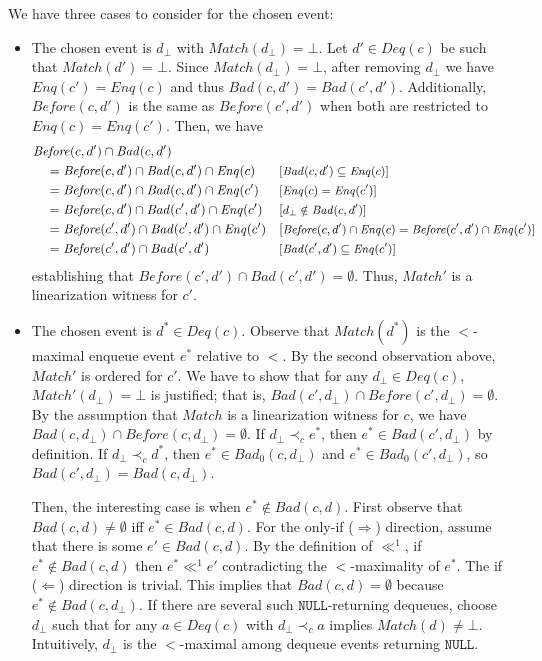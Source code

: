 \documentclass{LMCS}
\newcommand{\NULL}{\ensuremath{\mathtt{NULL}}}
\newcommand{\Match}{\ensuremath{\mathit{Match}}}
\newcommand{\Deq}[1]{\ensuremath{\mathit{Deq}({#1})}}
\newcommand{\Enq}[1]{\ensuremath{\mathit{Enq}({#1})}}
\newcommand{\Before}[2]{\ensuremath{\mathit{Before}({#1},{#2})}}
\newcommand{\Bad}[2]{\ensuremath{\mathit{Bad}(#1,#2)}}
\newcommand{\Badx}[3]{\ensuremath{\mathit{Bad}_{#3}(#1,#2)}}
\newcommand{\dhat}{\ensuremath{d_{\bot}}}
\begin{document}
We have three cases to consider for the chosen event:
\begin{itemize} 
\item The chosen event is $\dhat$ with $\Match(\dhat)=\bot$.
Let $d'\in \Deq c$ be such that $\Match(d')=\bot$.
Since $\Match(\dhat)=\bot$, after removing $\dhat$ we have $\Enq {c'}=\Enq c$ and thus $\Bad c {d'}=\Bad {c'} {d'}$.
Additionally, $\Before c {d'}$ is the same as $\Before {c'} {d'}$ when both are restricted to $\Enq c=\Enq {c'}$.
Then, we have
\begin{align*}
&\Before c {d'} \cap \Bad c {d'} &&\\
&\quad=\Before c {d'} \cap \Bad c {d'} \cap \Enq c &&\textnormal{\small [$\Bad c {d'}\subseteq \Enq c$]}\\
&\quad= \Before c {d'} \cap \Bad c {d'} \cap \Enq {c'} &&\textnormal{\small[$\Enq c=\Enq {c'}$]}\\
&\quad= \Before c {d'} \cap \Bad {c'} {d'} \cap \Enq {c'} &&\textnormal{[\small$\dhat\notin \Bad c {d'}$]}\\
&\quad= \Before {c'} {d'} \cap \Bad {c'} {d'} \cap \Enq {c'} &&\textnormal{[\small$\Before c {d'}\cap \Enq c=\Before {c'} {d'}\cap \Enq {c'}$]}\\
&\quad= \Before {c'} {d'} \cap \Bad {c'} {d'} &&\textnormal{\small[$\Bad {c'} {d'}\subseteq \Enq {c'}$]}
\end{align*}
establishing that $\Before {c'} {d'}\cap \Bad {c'} {d'}=\emptyset$.
Thus, $\Match'$ is a linearization witness for $c'$.

\item The chosen event is $d^*\in\Deq c$. 
Observe that $\Match(d^*)$ is the $<$-maximal enqueue event $e^*$ relative to $<$.
By the second observation above, $\Match'$ is ordered for $c'$.
We have to show that for any $\dhat\in \Deq c$, $\Match'(\dhat)=\bot$ is justified; that is, $\Bad {c'} {\dhat}\cap \Before {c'} {\dhat}=\emptyset$.
By the assumption that $\Match$ is a linearization witness for $c$, we have $\Bad c {\dhat} \cap \Before c {\dhat}=\emptyset$.
If $\dhat \prec_c e^*$, then $e^*\in \Bad {c'} {\dhat}$ by definition.
If $\dhat \prec_c d^*$, then $e^*\in \Badx c {\dhat} 0$ and $e^*\in \Badx {c'} {\dhat} 0$, so $\Bad {c'} {\dhat}=\Bad c {\dhat}$.

Then, the interesting case is when $e^*\notin \Bad c {d}$. 
First observe that $\Bad c {d}\neq\emptyset$ iff $e^*\in \Bad c {d}$.
For the only-if ($\Rightarrow$) direction, assume that there is some $e'\in \Bad c {d}$.
By the definition of $\ll^1$, if $e^*\notin \Bad c {d}$ then $e^*\ll^1 e'$ contradicting the $<$-maximality of $e^*$.
The if ($\Leftarrow$) direction is trivial.
This implies that $\Bad c {d}=\emptyset$ because $e^*\notin \Bad c {\dhat}$.
If there are several such \NULL-returning dequeues, choose $\dhat$ such that for any $a\in \Deq c$ with $\dhat\prec_c a$ implies $\Match(d)\neq\bot$.
Intuitively, $\dhat$ is the $<$-maximal among dequeue events returning \NULL.


\end{itemize}
\end{document}
